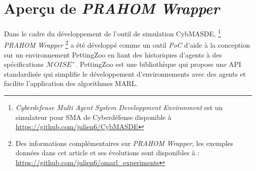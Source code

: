 \documentclass[demonstration]{jfsma}
\newcounter{relation}
\begin{document}
\section{Aperçu de \emph{PRAHOM Wrapper}}


Dans le cadre du développement de l'outil de simulation CybMASDE,
\footnote{\emph{Cyberdefense Multi Agent System Developpment Environment} est un simulateur pour SMA de Cyberdéfense disponible à \url{https://github.com/julien6/CybMASDE}}
\emph{PRAHOM Wrapper}\label{PettingZoo-wrapper}
\footnote{Des informations complémentaires sur \emph{PRAHOM Wrapper}, les exemples données dans cet article et ses évolutions sont disponibles à : \url{https://github.com/julien6/omarl_experiments}}
a été développé comme un outil \emph{PoC} d'aide à la conception sur un environnement PettingZoo en liant des historiques d'agents à des spécifications $\mathcal{M}OISE^+$. PettingZoo est une bibliothèque qui propose une API standardisée qui simplifie le développement d'environnements avec des agents et facilite l'application des algorithmes MARL.
\end{document}
